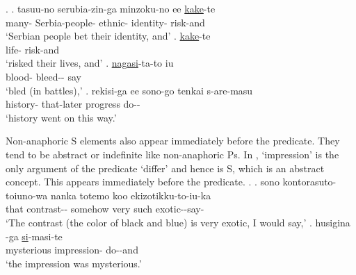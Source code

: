 \ex.\label{S00M0199_inoti}
 \ag. tasuu-no serubia-zin-ga minzoku-no ee  \ul{kake}-te \\
 	many- Serbia-people- ethnic-  identity- risk-and \\
	`Serbian people bet their identity, and'
 \bg.  \ul{kake}-te \\
 		life- risk-and \\
		`risked their lives, and'
 \bg.  \ul{nagasi}-ta-to iu \\
 		blood- bleed-- say \\
		`bled (in battles),'
 \bg. rekisi-ga ee sono-go tenkai s-are-masu \\
 	history-  that-later progress do-- \\
	`history went on this way.'

Non-anaphoric S elements also appear immediately before the predicate.
They tend to be abstract or indefinite like non-anaphoric Ps.
In \Next,
 `impression' is the only argument of the predicate  `differ' and hence is S,
which is an abstract concept.
This appears immediately before the predicate.
%
\ex.\label{S00F0014_kanzi}
 \ag. sono kontorasuto-toiuno-wa nanka totemo koo ekizotikku-to-iu-ka \\
 	that contrast-- somehow very such exotic--say- \\
	`The contrast (the color of black and blue) is very exotic, I would say,'
 \bg. husigina -ga \ul{si}-masi-te \\
 		mysterious impression- do--and \\
		`the impression was mysterious.'
%


